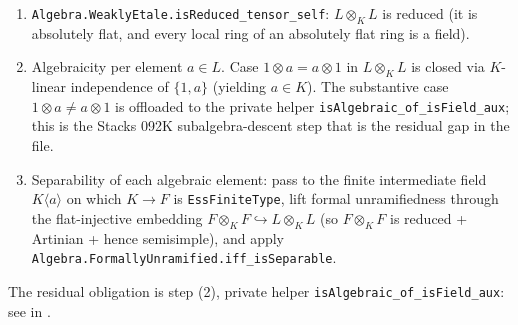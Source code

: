 \begin{enumerate}
  \item \texttt{Algebra.WeaklyEtale.isReduced\_tensor\_self}: $L \otimes_K L$
    is reduced (it is absolutely flat, and every local ring of an absolutely
    flat ring is a field).
  \item Algebraicity per element $a \in L$.
    Case $1 \otimes a = a \otimes 1$ in $L \otimes_K L$ is closed via
    $K$-linear independence of $\{1, a\}$ (yielding $a \in K$).
    The substantive case $1 \otimes a \neq a \otimes 1$ is offloaded to the
    private helper
    \texttt{isAlgebraic\_of\_isField\_aux}; this is the Stacks 092K
    subalgebra-descent step that is the residual gap in the file.
  \item Separability of each algebraic element: pass to the finite
    intermediate field $K\langle a\rangle$ on which $K \to F$ is
    \texttt{EssFiniteType}, lift formal unramifiedness through the
    flat-injective embedding $F \otimes_K F \hookrightarrow L \otimes_K L$
    (so $F \otimes_K F$ is reduced + Artinian + hence semisimple), and
    apply \texttt{Algebra.FormallyUnramified.iff\_isSeparable}.
\end{enumerate}

The residual obligation is step (2), private helper
\texttt{isAlgebraic\_of\_isField\_aux}: see
 in
.
